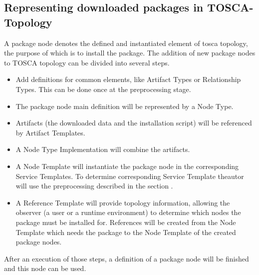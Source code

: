 \subsection{Representing downloaded packages in TOSCA-Topology} \label{subs:repres}
A package node denotes the defined and instantiated element of \gls{tosca} topology, the purpose of which is to install the package.
The addition of new package nodes to TOSCA topology can be divided into several steps.
\begin{itemize}
	\item Add definitions for common elements, like Artifact Types or Relationship Types. 
		This can be done once at the preprocessing stage.
	\item The package node main definition will be represented by a Node Type. 
	\item Artifacts (the downloaded data and the installation script) will be referenced by Artifact Templates.
	\item A Node Type Implementation will combine the artifacts.
	\item A Node Template will instantiate the package node in the corresponding Service Templates.
		To determine corresponding Service Template theautor will use the preprocessing described in the section .
	\item A Reference Template will provide topology information, allowing the observer (a user or a runtime environment) to determine which nodes the package must be installed for.
		References will be created from the Node Template which needs the package to the Node Template of the created package nodes.
\end{itemize}
After an execution of those steps, a definition of a package node will be finished and this node can be used.

